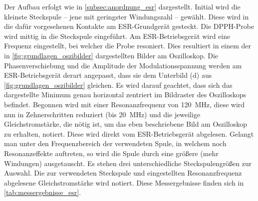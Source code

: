 \documentclass[ngerman]{scrartcl}
\begin{document}
Der Aufbau erfolgt wie in \autoref{subsec:anordnung_esr} dargestellt. Initial wird die kleinste Steckspule -- jene mit geringster Windungszahl -- gewählt. Diese wird in die dafür vorgesehenen Kontakte am ESR-Grundgerät gesteckt. Die DPPH-Probe wird mittig in die Steckspule eingeführt. Am ESR-Betriebsgerät wird eine Frequenz eingestellt, bei welcher die Probe resoniert. Dies resultiert in einem der in \autoref{fig:grundlagen_oszibilder} dargestellten Bilder am Oszilloskop. Die Phasenverschiebung und die Amplitude der Modulationsspannung werden am ESR-Betriebsgerät derart angepasst, dass sie dem Unterbild (d) aus \autoref{fig:grundlagen_oszibilder} gleichen. Es wird darauf geachtet, dass sich das dargestellte Minimum genau horizontal zentriert im Bildraster des Oszilloskops befindet. Begonnen wird mit einer Resonanzfrequenz von \SI{120}{MHz}, diese wird nun in Zehnerschritten reduziert (bis \SI{20}{MHz}) und die jeweilige Gleichstromstärke, die nötig ist, um das eben beschriebene Bild am Oszilloskop zu erhalten, notiert. Diese wird direkt vom ESR-Betriebsgerät abgelesen. Gelangt man unter den Frequenzbereich der verwendeten Spule, in welchem noch Resonanzeffekte auftreten, so wird die Spule durch eine größere (mehr Windungen) ausgetauscht. Es stehen drei unterschiedliche Steckspulengrößen zur Auswahl. Die zur verwendeten Steckspule und eingestellten Resonanzfrequenz abgelesene Gleichstromstärke wird notiert. Diese Messergebnisse finden sich in \autoref{tab:messergebnisse_esr}.
%
\end{document}
